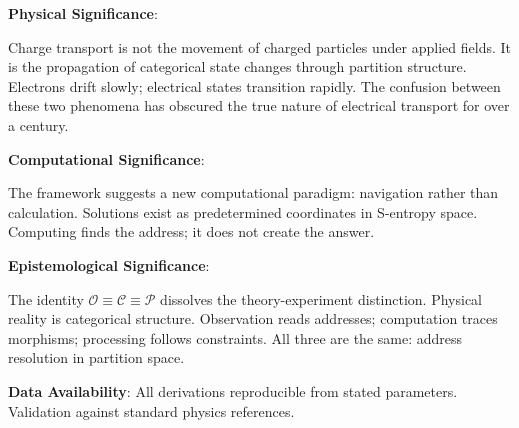 \documentclass[twocolumn,10pt]{article}
\theoremstyle{definition}
\theoremstyle{remark}
\newcommand{\Obs}{\mathcal{O}}
\newcommand{\Comp}{\mathcal{C}}
\newcommand{\Proc}{\mathcal{P}}
\begin{document}
\textbf{Physical Significance}:

Charge transport is not the movement of charged particles under applied fields. It is the propagation of categorical state changes through partition structure. Electrons drift slowly; electrical states transition rapidly. The confusion between these two phenomena has obscured the true nature of electrical transport for over a century.

\textbf{Computational Significance}:

The framework suggests a new computational paradigm: navigation rather than calculation. Solutions exist as predetermined coordinates in S-entropy space. Computing finds the address; it does not create the answer.

\textbf{Epistemological Significance}:

The identity $\Obs \equiv \Comp \equiv \Proc$ dissolves the theory-experiment distinction. Physical reality is categorical structure. Observation reads addresses; computation traces morphisms; processing follows constraints. All three are the same: address resolution in partition space.

\vspace{1em}
\noindent\textbf{Data Availability}: All derivations reproducible from stated parameters. Validation against standard physics references.



\end{document}
